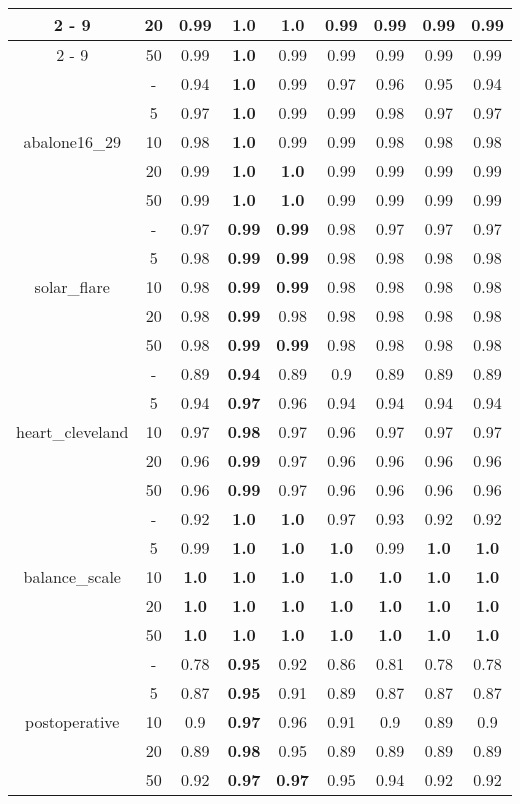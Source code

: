 \documentclass{article}%
\begin{document}
\begin{longtable}{c|c|ccccccc}
\cline{2%
-%
9}%
&20&0.99&\textbf{1.0}&\textbf{1.0}&0.99&0.99&0.99&0.99\\%
\cline{2%
-%
9}%
&50&0.99&\textbf{1.0}&0.99&0.99&0.99&0.99&0.99\\%
\hline%
\multirow{5}{*}{abalone16\_29}&{-}&0.94&\textbf{1.0}&0.99&0.97&0.96&0.95&0.94\\%
\cline{2%
-%
9}%
&5&0.97&\textbf{1.0}&0.99&0.99&0.98&0.97&0.97\\%
\cline{2%
-%
9}%
&10&0.98&\textbf{1.0}&0.99&0.99&0.98&0.98&0.98\\%
\cline{2%
-%
9}%
&20&0.99&\textbf{1.0}&\textbf{1.0}&0.99&0.99&0.99&0.99\\%
\cline{2%
-%
9}%
&50&0.99&\textbf{1.0}&\textbf{1.0}&0.99&0.99&0.99&0.99\\%
\hline%
\multirow{5}{*}{solar\_flare}&{-}&0.97&\textbf{0.99}&\textbf{0.99}&0.98&0.97&0.97&0.97\\%
\cline{2%
-%
9}%
&5&0.98&\textbf{0.99}&\textbf{0.99}&0.98&0.98&0.98&0.98\\%
\cline{2%
-%
9}%
&10&0.98&\textbf{0.99}&\textbf{0.99}&0.98&0.98&0.98&0.98\\%
\cline{2%
-%
9}%
&20&0.98&\textbf{0.99}&0.98&0.98&0.98&0.98&0.98\\%
\cline{2%
-%
9}%
&50&0.98&\textbf{0.99}&\textbf{0.99}&0.98&0.98&0.98&0.98\\%
\hline%
\multirow{5}{*}{heart\_cleveland}&{-}&0.89&\textbf{0.94}&0.89&0.9&0.89&0.89&0.89\\%
\cline{2%
-%
9}%
&5&0.94&\textbf{0.97}&0.96&0.94&0.94&0.94&0.94\\%
\cline{2%
-%
9}%
&10&0.97&\textbf{0.98}&0.97&0.96&0.97&0.97&0.97\\%
\cline{2%
-%
9}%
&20&0.96&\textbf{0.99}&0.97&0.96&0.96&0.96&0.96\\%
\cline{2%
-%
9}%
&50&0.96&\textbf{0.99}&0.97&0.96&0.96&0.96&0.96\\%
\hline%
\multirow{5}{*}{balance\_scale}&{-}&0.92&\textbf{1.0}&\textbf{1.0}&0.97&0.93&0.92&0.92\\%
\cline{2%
-%
9}%
&5&0.99&\textbf{1.0}&\textbf{1.0}&\textbf{1.0}&0.99&\textbf{1.0}&\textbf{1.0}\\%
\cline{2%
-%
9}%
&10&\textbf{1.0}&\textbf{1.0}&\textbf{1.0}&\textbf{1.0}&\textbf{1.0}&\textbf{1.0}&\textbf{1.0}\\%
\cline{2%
-%
9}%
&20&\textbf{1.0}&\textbf{1.0}&\textbf{1.0}&\textbf{1.0}&\textbf{1.0}&\textbf{1.0}&\textbf{1.0}\\%
\cline{2%
-%
9}%
&50&\textbf{1.0}&\textbf{1.0}&\textbf{1.0}&\textbf{1.0}&\textbf{1.0}&\textbf{1.0}&\textbf{1.0}\\%
\hline%
\multirow{5}{*}{postoperative}&{-}&0.78&\textbf{0.95}&0.92&0.86&0.81&0.78&0.78\\%
\cline{2%
-%
9}%
&5&0.87&\textbf{0.95}&0.91&0.89&0.87&0.87&0.87\\%
\cline{2%
-%
9}%
&10&0.9&\textbf{0.97}&0.96&0.91&0.9&0.89&0.9\\%
\cline{2%
-%
9}%
&20&0.89&\textbf{0.98}&0.95&0.89&0.89&0.89&0.89\\%
\cline{2%
-%
9}%
&50&0.92&\textbf{0.97}&\textbf{0.97}&0.95&0.94&0.92&0.92\\%
\hline%
\end{longtable}
\end{document}
